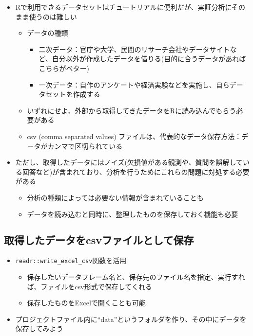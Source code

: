 \documentclass[
]{ltjsarticle}
\providecommand{\tightlist}{%
  \setlength{\itemsep}{0pt}\setlength{\parskip}{0pt}}
\begin{document}
\begin{itemize}
\tightlist
\item
  Rで利用できるデータセットはチュートリアルに便利だが、実証分析にそのまま使うのは難しい

  \begin{itemize}
  \tightlist
  \item
    データの種類

    \begin{itemize}
    \tightlist
    \item
      二次データ：官庁や大学、民間のリサーチ会社やデータサイトなど、自分以外が作成したデータを借りる(目的に合うデータがあればこちらがベター)
    \item
      一次データ：自作のアンケートや経済実験などを実施し、自らデータセットを作成する
    \end{itemize}
  \item
    いずれにせよ、外部から取得してきたデータをRに読み込んでもらう必要がある
  \item
    csv (comma separated values)
    ファイルは、代表的なデータ保存方法：データがカンマで区切られている
  \end{itemize}
\item
  ただし、取得したデータにはノイズ(欠損値がある観測や、質問を誤解している回答など)が含まれており、分析を行うためにこれらの問題に対処する必要がある

  \begin{itemize}
  \tightlist
  \item
    分析の種類によっては必要ない情報が含まれていることも
  \item
    データを読み込むと同時に、整理したものを保存しておく機能も必要
  \end{itemize}
\end{itemize}

\hypertarget{ux53d6ux5f97ux3057ux305fux30c7ux30fcux30bfux3092csvux30d5ux30a1ux30a4ux30ebux3068ux3057ux3066ux4fddux5b58}{%
\subsection{取得したデータをcsvファイルとして保存}\label{ux53d6ux5f97ux3057ux305fux30c7ux30fcux30bfux3092csvux30d5ux30a1ux30a4ux30ebux3068ux3057ux3066ux4fddux5b58}}

\begin{itemize}
\tightlist
\item
  \texttt{readr::write\_excel\_csv}関数を活用

  \begin{itemize}
  \tightlist
  \item
    保存したいデータフレーム名と、保存先のファイル名を指定、実行すれば、ファイルをcsv形式で保存してくれる
  \item
    保存したものをExcelで開くことも可能
  \end{itemize}
\item
  プロジェクトファイル内に``data''というフォルダを作り、その中にデータを保存してみよう
\end{itemize}
\end{document}
